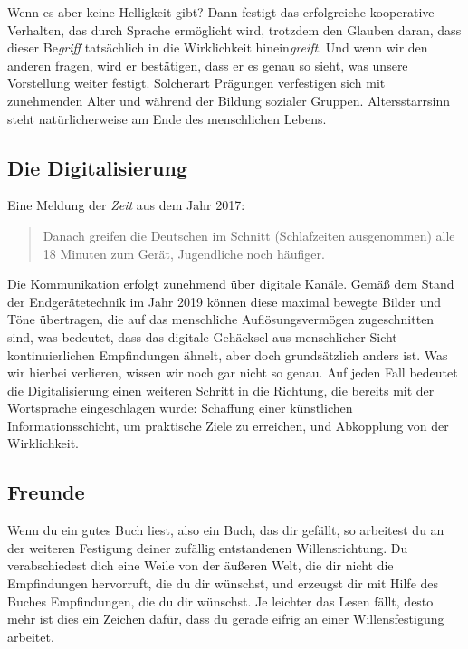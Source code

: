 \documentclass[12pt]{book}
\begin{document}
Wenn es aber keine Helligkeit gibt? Dann festigt das erfolgreiche kooperative Verhalten, das durch Sprache ermöglicht wird, trotzdem den Glauben daran, dass dieser Be\textit{griff} tatsächlich in die Wirklichkeit hinein\textit{greift}. Und wenn wir den anderen fragen, wird er bestätigen, dass er es genau so sieht, was unsere Vorstellung weiter festigt. Solcherart Prägungen verfestigen sich mit zunehmenden Alter und während der Bildung sozialer Gruppen. Altersstarrsinn steht natürlicherweise am Ende des menschlichen Lebens.

\subsection{Die Digitalisierung}

Eine Meldung der \textit{Zeit} aus dem Jahr 2017: 
\begin{quote}\begin{tcolorbox}
Danach greifen die Deutschen im Schnitt (Schlafzeiten ausgenommen) alle 18 Minuten zum Gerät, Jugendliche noch häufiger.
\end{tcolorbox}\end{quote}

Die Kommunikation erfolgt zunehmend über digitale Kanäle. Gemäß dem Stand der Endgerätetechnik im Jahr 2019 können diese maximal bewegte Bilder und Töne übertragen, die auf das menschliche Auflösungsvermögen zugeschnitten sind, was bedeutet, dass das digitale Gehäcksel aus menschlicher Sicht kontinuierlichen Empfindungen ähnelt, aber doch grundsätzlich anders ist. Was wir hierbei verlieren, wissen wir noch gar nicht so genau. Auf jeden Fall bedeutet die Digitalisierung einen weiteren Schritt in die Richtung, die bereits mit der Wortsprache eingeschlagen wurde: Schaffung einer künstlichen Informationsschicht, um praktische Ziele zu erreichen, und Abkopplung von der Wirklichkeit.

\subsection{Freunde}

Wenn du ein gutes Buch liest, also ein Buch, das dir gefällt, so arbeitest du an der weiteren Festigung deiner zufällig entstandenen Willensrichtung. Du verabschiedest dich eine Weile von der äußeren Welt, die dir nicht die Empfindungen hervorruft, die du dir wünschst, und erzeugst dir mit Hilfe des Buches Empfindungen, die du dir  wünschst. Je leichter das Lesen fällt, desto mehr ist dies ein Zeichen dafür, dass du gerade eifrig an einer Willensfestigung arbeitet. 
\end{document}
